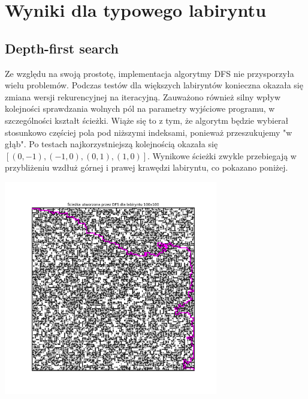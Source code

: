 \documentclass[a4paper,12pt]{article}
\begin{document}
\section{Wyniki dla typowego labiryntu}

\subsection{Depth-first search}
	Ze względu na swoją prostotę, implementacja algorytmy DFS nie przysporzyła wielu problemów. Podczas testów dla większych labiryntów konieczna okazała się zmiana wersji rekurencyjnej na iteracyjną. Zauważono również silny wpływ kolejności sprawdzania wolnych pól na parametry wyjściowe programu, w szczególności kształt ścieżki. Wiąże się to z tym, że algorytm będzie wybierał stosunkowo częściej pola pod niższymi indeksami, ponieważ przeszukujemy "w głąb". Po testach najkorzystniejszą kolejnością okazała się $[(0, -1), (-1, 0), (0, 1), (1, 0)]$. Wynikowe ścieżki zwykle przebiegają w przybliżeniu wzdłuż górnej i prawej krawędzi labiryntu, co pokazano poniżej.
\begin{center}
    \includegraphics[width=0.7\textwidth]{../images/DFS_path.png}
\end{center}
\end{document}
